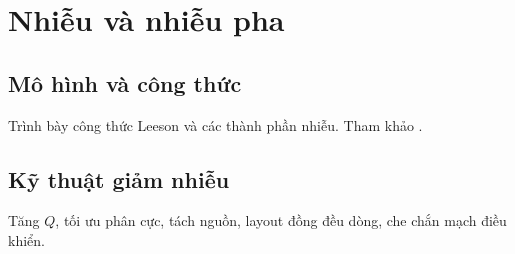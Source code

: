 \chapter{Nhiễu và nhiễu pha}
\section{Mô hình và công thức}
Trình bày công thức Leeson và các thành phần nhiễu. Tham khảo \cite{leeson1966,razavi_rf}.
\section{Kỹ thuật giảm nhiễu}
Tăng \(Q\), tối ưu phân cực, tách nguồn, layout đồng đều dòng, che chắn mạch điều khiển.


